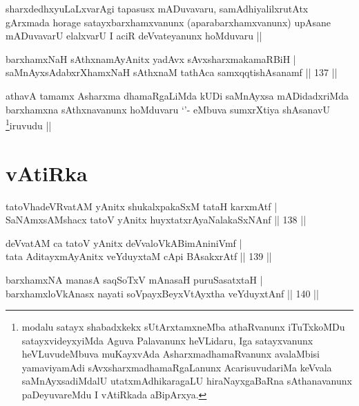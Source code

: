 \begin{artha}
sharxdedhxyuLaLxvarAgi tapasusx mADuvavaru, samAdhiyalilxrutAtx
gArxmada horage satayxbarxhamxvanunx (aparabarxhamxvanunx) upAsane
mADuvavarU elalxvarU I aciR deVvateyanunx hoMduvaru ||
\end{artha}


\begin{shl}
barxhamxNaH sAthxnamAyAnitx yadAvx sAvxsharxmakamaRBiH | \\
saMnAyxsAdabxrXhamxNaH sAthxnaM tathAca samxqqtishAsanamf \hfill|| 137 || 
\end{shl}

\begin{artha}
athavA tamamx Asharxma dhamaRgaLiMda kUDi saMnAyxsa mADidadxriMda
barxhamxna sAthxnavanunx hoMduvaru `\stext'- eMbuva sumxrXtiya
shAsanavU \footnote{modalu satayx shabadxkekx sUtArxtamxneMba
  athaRvanunx iTuTxkoMDu satayxvideyxyiMda Aguva Palavanunx heVLidaru,
Iga satayxvanunx heVLuvudeMbuva muKayxvAda AsharxmadhamaRvanunx
avalaMbisi yamaviyamAdi sAvxsharxmadhamaRgaLanunx AcarisuvudariMa
keVvala saMnAyxsadiMdalU utatxmAdhikaragaLU hiraNayxgaBaRna
sAthanavanunx paDeyuvareMdu I vAtiRkada aBipArxya.}iruvudu ||
\end{artha}

\section*{vAtiRka}


\begin{shl}
tatoV\s hadeVRvatAM yAnitx shukalxpakaSxM tataH karxmAtf | \\
SaNAmxsAMshacx tatoV yAnitx huyxtatxrAyaNalakaSxNAnf \hfill|| 138 || 
\end{shl}

\begin{shl}
deVvatAM ca tatoV yAnitx deVvaloVkABimAniniVmf | \\
tata AditayxmAyAnitx veYduyxtaM cApi BAsakxrAtf \hfill|| 139 || 
\end{shl}

\begin{shl}
barxhamxNA manasA saqSoTxV mAnasaH puruSasatxtaH | \\
barxhamxloVkAnasx nayati soV\s payxBeyxVtAyxtha veYduyxtAnf \hfill|| 140 || 
\end{shl}

